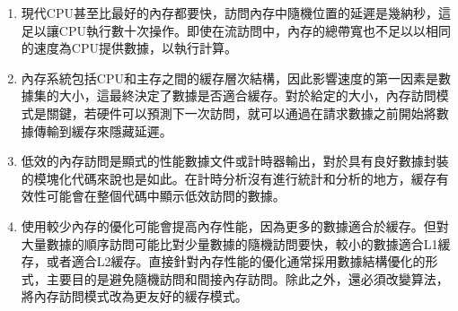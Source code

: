 \begin{enumerate}
\item 
現代CPU甚至比最好的內存都要快，訪問內存中隨機位置的延遲是幾納秒，這足以讓CPU執行數十次操作。即使在流訪問中，內存的總帶寬也不足以以相同的速度為CPU提供數據，以執行計算。

\item 
內存系統包括CPU和主存之間的緩存層次結構，因此影響速度的第一因素是數據集的大小，這最終決定了數據是否適合緩存。對於給定的大小，內存訪問模式是關鍵，若硬件可以預測下一次訪問，就可以通過在請求數據之前開始將數據傳輸到緩存來隱藏延遲。

\item 
低效的內存訪問是顯式的性能數據文件或計時器輸出，對於具有良好數據封裝的模塊化代碼來說也是如此。在計時分析沒有進行統計和分析的地方，緩存有效性可能會在整個代碼中顯示低效訪問的數據。

\item
使用較少內存的優化可能會提高內存性能，因為更多的數據適合於緩存。但對大量數據的順序訪問可能比對少量數據的隨機訪問要快，較小的數據適合L1緩存，或者適合L2緩存。直接針對內存性能的優化通常採用數據結構優化的形式，主要目的是避免隨機訪問和間接內存訪問。除此之外，還必須改變算法，將內存訪問模式改為更友好的緩存模式。

\end{enumerate}